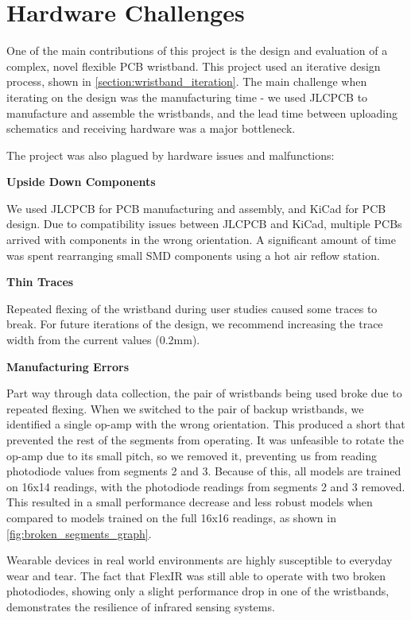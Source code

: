\documentclass[ oneside,%
                    author={Jack Jarvis},
                    degree={BSc},
                     title={FlexIR: Flexible PCB Wristbands for Infrared Based Gesture Recognition},
                    unit={COMS30045},
                    subtitle={Investigating the Effect of LED Viewing Angle on Gesture Classification in Infrared Sensing Systems}]{dissertation}
\begin{document}
\section{Hardware Challenges}
One of the main contributions of this project is the design and evaluation of a complex, novel flexible PCB wristband. This project used an iterative design process, shown in \cref{section:wristband_iteration}. The main challenge when iterating on the design was the manufacturing time - we used JLCPCB to manufacture and assemble the wristbands, and the lead time between uploading schematics and receiving hardware was a major bottleneck.

The project was also plagued by hardware issues and malfunctions:

\textbf{Upside Down Components}

We used JLCPCB for PCB manufacturing and assembly, and KiCad for PCB design. Due to compatibility issues between JLCPCB and KiCad, multiple PCBs arrived with components in the wrong orientation. A significant amount of time was spent rearranging small SMD components using a hot air reflow station.

\textbf{Thin Traces}

Repeated flexing of the wristband during user studies caused some traces to break. For future iterations of the design, we recommend increasing the trace width from the current values (0.2mm).

\textbf{Manufacturing Errors}

Part way through data collection, the pair of wristbands being used broke due to repeated flexing. When we switched to the pair of backup wristbands, we identified a single op-amp with the wrong orientation. This produced a short that prevented the rest of the segments from operating. It was unfeasible to rotate the op-amp due to its small pitch, so we removed it, preventing us from reading photodiode values from segments 2 and 3. Because of this, all models are trained on 16x14 readings, with the photodiode readings from segments 2 and 3 removed. This resulted in a small performance decrease and less robust models when compared to models trained on the full 16x16 readings, as shown in \cref{fig:broken_segments_graph}.

Wearable devices in real world environments are highly susceptible to everyday wear and tear. The fact that FlexIR was still able to operate with two broken photodiodes, showing only a slight performance drop in one of the wristbands, demonstrates the resilience of infrared sensing systems.
\end{document}

